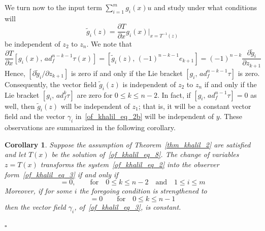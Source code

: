 \documentclass[11pt,a4paper,oneside]{book}
\numberwithin{equation}{section}
\theoremstyle{it}
\newtheorem{corollary}{Corollary}[chapter]
\theoremstyle{definition}
\begin{document}
We turn now to the input term $\sum_{i=1}^{m}g_i(x)u$ and study under what conditions will 
\begin{equation*}
	\tilde{g}_i(z)=\frac{\partial T}{\partial x}g_i(x)\Bigg|_{x=T^{-1}(z)}
\end{equation*}
be independent of $z_2$ to $z_n$. We note that 
\begin{equation*}
	\frac{\partial T}{\partial x}[g_i(x),\,ad_f^{n-k-1}\tau(x)]=[\tilde{g}_i(z),\,(-1)^{n-k-1}e_{k+1}]=(-1)^{n-k}\frac{\partial \tilde{g}_i}{\partial z_{k+1}}
\end{equation*}
Hence, $[\partial \tilde{g}_i/\partial z_{k+1}]$ is zero if and only if the Lie bracket $[g_i,\,ad_f^{n-k-1}\tau]$ is zero. Consequently, the vector field $\tilde{g}_i(z)$ is independent of $z_2$ to $z_n$ if and only if the Lie bracket $[g_i,\,ad_f^k\tau]$ are zero for $0\le k\le n-2$. In fact, if $[g_i,\,ad_f^{n-1}\tau]=0$ as well, then $\tilde{g}_i(z)$ will be independent of $z_1$; that is, it will be a constant vector field and the vector $\gamma_i$ in~\eqref{of_khalil_eq_2b} will be independent of $y$. These observations are summarized in the following corollary.
\begin{corollary}\label{corollary_khalil_1}
	Suppose the assumption of Theorem~\ref{thm_khalil_2} are satisfied and let $T(x)$ be the solution of~\eqref{of_khalil_eq_8}. The change of variables $z=T(x)$ transforms the system~\eqref{of_khalil_eq_2} into the observer form~\eqref{of_khalil_eq_3} if and only if
	\begin{equation*}
		[g_i,\,ad_f^k\tau]=0,\qquad\text{for}\quad 0\le k \le n-2 \quad\text{and}\quad 1\le i \le m
	\end{equation*}
 	Moreover, if for some $i$ the foregoing condition is strengthened to 
 	\begin{equation*}
 		[g_i,\,ad_f^k\tau]=0\qquad\text{for}\quad 0\le k \le n-1
 	\end{equation*}
 then the vector field $\gamma_i$, of~\eqref{of_khalil_eq_3}, is constant.
 
		\hfill$\square$
\end{corollary}
\end{document}
